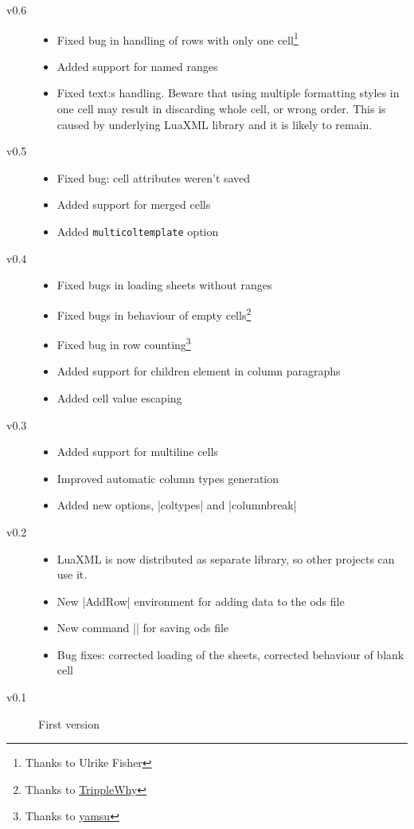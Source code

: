 \documentclass{ltxdoc}
\newcommand\ods{\textsf{ods}\xspace}
\begin{document}
\begin{description}
\item[v0.6]
  \begin{itemize}
    \item  Fixed bug in handling of rows with only one cell\footnote{Thanks to Ulrike Fisher}
    \item  Added support for named ranges
    \item  Fixed text:s handling. Beware that using multiple formatting styles
      in one cell may result in discarding whole cell, or wrong order. This is
      caused by underlying LuaXML library and it is likely to remain.
\end{itemize}
\item[v0.5]
\begin{itemize}
  \item Fixed bug: cell attributes weren't saved
  \item Added support for merged cells
  \item Added \texttt{multicoltemplate} option
\end{itemize}

\item[v0.4]
\begin{itemize}
	\item Fixed bugs in loading sheets without ranges
	\item Fixed bugs in behaviour of empty cells\footnote{Thanks to \href{https://github.com/TripleWhy}{TrippleWhy}}
  \item Fixed bug in row counting\footnote{Thanks to \href{https://github.com/yamsu}{yamsu}}
	\item Added support for children element in column paragraphs
	\item Added cell value escaping
\end{itemize}
\item[v0.3]
\begin{itemize}
  \item Added support for multiline cells
  \item Improved automatic column types generation
  \item Added new options, |coltypes| and |columnbreak|
\end{itemize}
\item[v0.2] 
\begin{itemize}
 \item LuaXML is now distributed as separate library, so other projects can use it.
 \item New |AddRow| environment for adding data to the \ods file
 \item New command |\savespreadsheet| for saving \ods file
 \item Bug fixes: corrected loading of the sheets, corrected behaviour of blank cell 
\end{itemize}
\item[v0.1] First version
\end{description}
\end{document}
